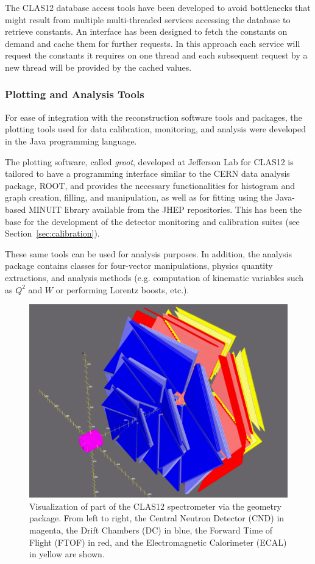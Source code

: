 The CLAS12 database access tools have been developed to avoid bottlenecks that might result from multiple
multi-threaded services accessing the database to retrieve constants.  An interface has been designed to fetch
the constants on demand and cache them for further requests. In this approach each service will request the
constants it requires on one thread and each subsequent request by a new thread will be provided by the cached
values.

\subsubsection{Plotting and Analysis Tools}

For ease of integration with the reconstruction software tools and packages, the plotting tools used for data
calibration, monitoring, and analysis were developed in the Java programming language.

The plotting software, called {\it groot}, developed at Jefferson Lab for CLAS12 is tailored to have a programming
interface similar to the CERN data analysis package, ROOT, and provides the necessary functionalities for
histogram and graph creation, filling, and manipulation, as well as for fitting using the Java-based MINUIT library
available from the JHEP repositories. This has been the base for the development of the detector monitoring and
calibration suites (see Section~\ref{sec:calibration}).

These same tools can be used for analysis purposes. In addition, the analysis package contains classes for four-vector
manipulations, physics quantity extractions, and analysis methods (e.g. computation of kinematic variables such as
$Q^2$ and $W$ or performing Lorentz boosts, etc.).

\begin{figure}
\centering
\includegraphics[width=1.0\columnwidth]{pics/detectorview.png}
\caption{Visualization of part of the CLAS12 spectrometer via the geometry package. From left to right, the Central
  Neutron Detector (CND) in magenta, the Drift Chambers (DC) in blue, the Forward Time of Flight (FTOF) in red,
  and the Electromagnetic Calorimeter (ECAL) in yellow are shown.}
\label{fig:detectorview}
\end{figure}

